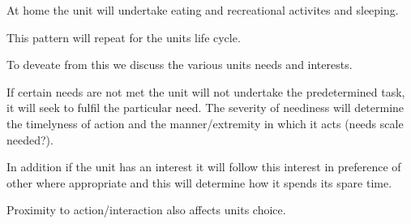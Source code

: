 At home the unit will undertake eating and recreational activites and sleeping.

This pattern will repeat for the units life cycle.

To deveate from this we discuss the various units needs and interests. 

If certain needs are not met the unit will not undertake the predetermined task, it will seek to fulfil the particular need. The severity of neediness will determine the timelyness of action and the manner/extremity in which it acts (needs scale needed?).

In addition if the unit has an interest it will follow this interest in preference of other where appropriate and this will determine how it spends its spare time.

Proximity to action/interaction also affects units choice.






